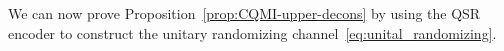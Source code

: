 \documentclass[a4paper,aps,prl,twocolumn,10pt,superscriptaddress]{revtex4-1}
\theoremstyle{plain}
\theoremstyle{definition}
\begin{document}
We can now prove Proposition~\ref{prop:CQMI-upper-decons} by using the QSR encoder to construct the unitary randomizing channel~\eqref{eq:unital_randomizing}.

\end{document}
